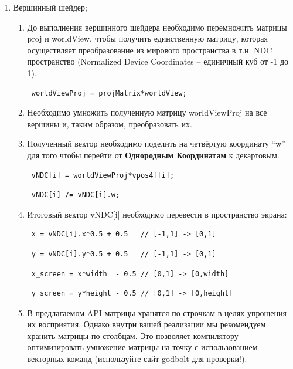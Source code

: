 \documentclass[12pt,subf,href,colorlinks=true]{article}
\begin{document}
\begin{enumerate}
\item Вершинный шейдер;
\begin{enumerate}
  \item До выполнения вершинного шейдера необходимо перемножить матрицы proj и worldView, чтобы получить единственную матрицу, которая осуществляет преобразование из мирового пространства в т.н. NDC пространство (Normalized Device Coordinates -- единичный куб от -1 до 1).
  \begin{verbatim} worldViewProj = projMatrix*worldView; \end{verbatim}
  
  \item Необходимо умножить полученную матрицу worldViewProj на все вершины и, таким образом, преобразовать их.
  
  \item Полученный вектор необходимо поделить на четвёртую координату ``w'' для того чтобы перейти от \textbf{Однородным Координатам} \cite{ignatenkocoords} к декартовым. 
  
  \begin{verbatim} vNDC[i] = worldViewProj*vpos4f[i];  \end{verbatim}
  \begin{verbatim} vNDC[i] /= vNDC[i].w; \end{verbatim}
  
  \item Итоговый вектор vNDC[i] необходимо перевести в пространство экрана:
  \begin{verbatim} x = vNDC[i].x*0.5 + 0.5   // [-1,1] -> [0,1]  \end{verbatim}
  \begin{verbatim} y = vNDC[i].y*0.5 + 0.5   // [-1,1] -> [0,1]  \end{verbatim}
  \begin{verbatim} x_screen = x*width  - 0.5 // [0,1] -> [0,width] \end{verbatim}
  \begin{verbatim} y_screen = y*height - 0.5 // [0,1] -> [0,height] \end{verbatim}
  
  \item В предлагаемом API матрицы хранятся по строчкам в целях упрощения их восприятия. Однако внутри вашей реализации мы рекомендуем хранить матрицы по столбцам. Это позволяет компилятору оптимизировать умножение матрицы на точку с использованием векторных команд (используйте сайт godbolt \cite{godbolt} для проверки!).
  

\end{enumerate}
\end{enumerate}
\end{document}
